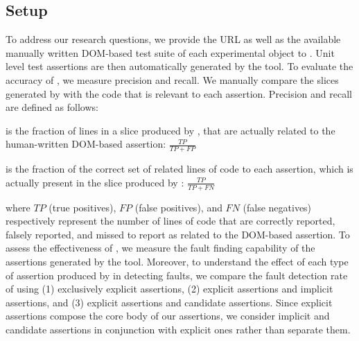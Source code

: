 \subsection{Setup} \label{Sec:setup}
To address our research questions, we provide the URL as well as the available manually written DOM-based test suite of each experimental object to \tool. Unit level test assertions are then automatically generated by the tool.
 To evaluate the accuracy of \tool, we measure precision and recall. We manually compare the slices generated by \tool with the \javascript code that is relevant to each assertion. Precision and recall are defined as follows:
\begin{description}[noitemsep, nolistsep, font=\normalfont\itshape]
\item [Precision] is the fraction of lines in a slice produced by \tool, that are actually related to the human-written DOM-based assertion: $\frac{TP}{TP+FP}$ 
\item [Recall] is the fraction of the correct set of related lines of code to each assertion, which is actually present in the slice produced by \tool: $\frac{TP}{TP+FN}$ 
\end{description}
where $TP$ (true positives), $FP$ (false positives), and $FN$ (false negatives) respectively represent the number of lines of code that are correctly reported, falsely reported, and missed to report as related to the DOM-based assertion.
 To assess the effectiveness of \tool, we measure the fault finding capability of the assertions generated by the tool. Moreover, to understand the effect of each type of assertion produced by \tool in detecting faults, we compare the fault detection rate of using (1) exclusively explicit assertions, (2) explicit assertions and implicit assertions, and (3) explicit assertions and candidate assertions. Since explicit assertions compose the core body of our assertions, we consider implicit and candidate assertions in conjunction with explicit ones rather than separate them.
       
